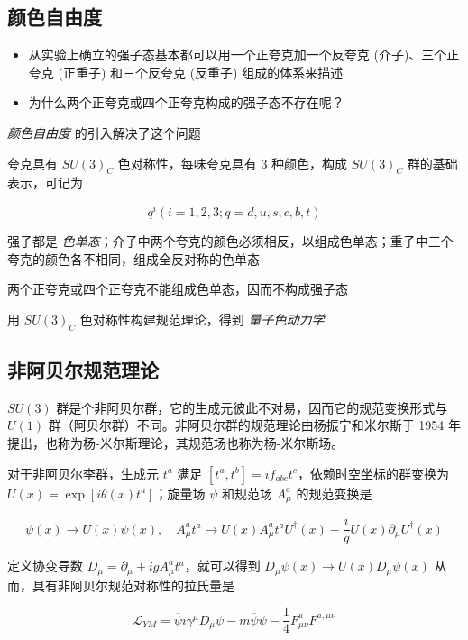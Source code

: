 \documentclass[oneside,a4paper,openany,11pt]{ctexbook}
\begin{document}
\subsection{颜色自由度}

\begin{itemize}
    \item 从实验上确立的强子态基本都可以用一个正夸克加一个反夸克 (介子)、三个正夸克 (正重子) 和三个反夸克 (反重子) 组成的体系来描述
    \item 为什么两个正夸克或四个正夸克构成的强子态不存在呢？
\end{itemize}

\emph{颜色自由度} 的引入解决了这个问题

夸克具有 $SU(3)_C$ 色对称性，每味夸克具有 $3$ 种颜色，构成 $SU(3)_C$ 群的基础表示，可记为

\begin{equation}
    q^i (i = 1, 2, 3; q = d, u, s, c, b, t)
\end{equation}

强子都是 \emph{色单态}；介子中两个夸克的颜色必须相反，以组成色单态；重子中三个夸克的颜色各不相同，组成全反对称的色单态

两个正夸克或四个正夸克不能组成色单态，因而不构成强子态

用 $SU(3)_C$ 色对称性构建规范理论，得到 \emph{量子色动力学}

\subsection{非阿贝尔规范理论}

$SU(3)$ 群是个非阿贝尔群，它的生成元彼此不对易，因而它的规范变换形式与 $U(1)$ 群（阿贝尔群）不同。非阿贝尔群的规范理论由杨振宁和米尔斯于 1954 年提出，也称为杨-米尔斯理论，其规范场也称为杨-米尔斯场。

对于非阿贝尔李群，生成元 $t^a$ 满足 $[t^a, t^b] = i f_{abc} t^c$，依赖时空坐标的群变换为 $U(x) = \exp[i\theta(x) t^a]$；旋量场 $\psi$ 和规范场 $A^a_\mu$ 的规范变换是

\begin{equation}
    \psi(x) \to U(x) \psi(x), \quad A_\mu^a t^a \to U(x) A_\mu^a t^a U^\dagger(x) - \frac{i}{g} U(x) \partial_\mu U^\dagger(x)
\end{equation}

定义协变导数 $D_\mu = \partial_\mu + ig A^a_\mu t^a$，就可以得到 $D_\mu \psi(x) \to U(x) D_\mu \psi(x)$ 从而，具有非阿贝尔规范对称性的拉氏量是

\begin{equation}
    \mathcal{L}_{YM} = \overline{\psi} i \gamma^\mu D_\mu \psi - m \overline{\psi} \psi - \frac{1}{4} F_{\mu\nu}^a F^{a,\mu\nu}
\end{equation}
\end{document}
